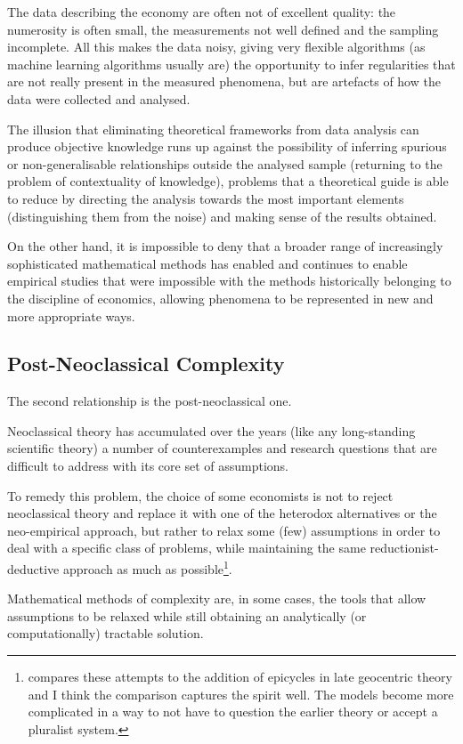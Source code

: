 The data describing the economy are often not of excellent quality: the numerosity is often small, the measurements not well defined and the sampling incomplete.
All this makes the data noisy, giving very flexible algorithms (as machine learning algorithms usually are) the opportunity to infer regularities that are not really present in the measured phenomena, but are artefacts of how the data were collected and analysed.

The illusion that eliminating theoretical frameworks from data analysis can produce objective knowledge runs up against the possibility of inferring spurious or non-generalisable relationships outside the analysed sample (returning to the problem of contextuality of knowledge), problems that a theoretical guide is able to reduce by directing the analysis towards the most important elements (distinguishing them from the noise) and making sense of the results obtained.

On the other hand, it is impossible to deny that a broader range of increasingly sophisticated mathematical methods has enabled and continues to enable empirical studies that were impossible with the methods historically belonging to the discipline of economics, allowing phenomena to be represented in new and more appropriate ways.

\subsection{Post-Neoclassical Complexity}
The second relationship is the post-neoclassical one.

Neoclassical theory has accumulated over the years (like any long-standing scientific theory) a number of counterexamples and research questions that are difficult to address with its core set of assumptions.

To remedy this problem, the choice of some economists is not to reject neoclassical theory and replace it with one of the heterodox alternatives or the neo-empirical approach, but rather to relax some (few) assumptions in order to deal with a specific class of problems, while maintaining the same reductionist-deductive approach as much as possible\footnote{\textcite{kanazawa2021} compares these attempts to the addition of epicycles in late geocentric theory and I think the comparison captures the spirit well. The models become more complicated in a way to not have to question the earlier theory or accept a pluralist system.}.

Mathematical methods of complexity are, in some cases, the tools that allow assumptions to be relaxed while still obtaining an analytically (or computationally) tractable solution.

